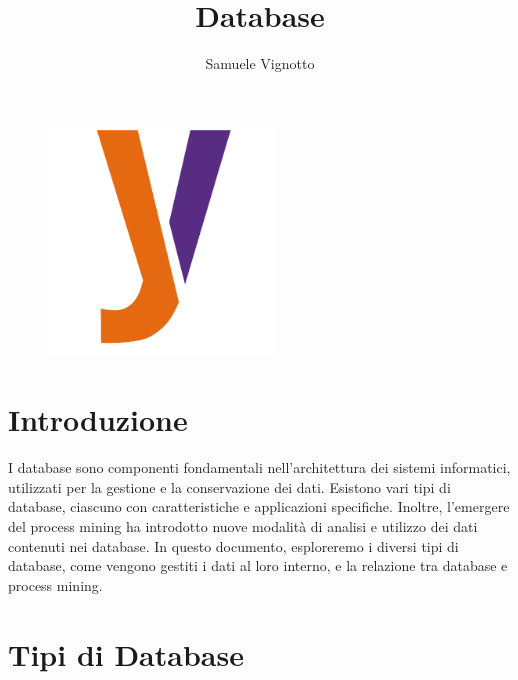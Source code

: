 \documentclass{article}
\title{\Huge{\textbf{Database}}\vspace{-1em}}
\author{Samuele Vignotto}
\date{}
\begin{document}
\maketitle
\begin{figure}[h]
  \centering
  \includegraphics[width=6cm, height=6cm]{Logo/Y_LOGO-SOLO.png}
  \label{fig:immagine}
\end{figure}

\newpage
\tableofcontents
\newpage

\section{Introduzione}
I database sono componenti fondamentali nell'architettura dei sistemi informatici, utilizzati per la gestione e la conservazione dei dati. Esistono vari tipi di database, ciascuno con caratteristiche e applicazioni specifiche. Inoltre, l'emergere del process mining ha introdotto nuove modalità di analisi e utilizzo dei dati contenuti nei database. In questo documento, esploreremo i diversi tipi di database, come vengono gestiti i dati al loro interno, e la relazione tra database e process mining.

\section{Tipi di Database}
\end{document}
